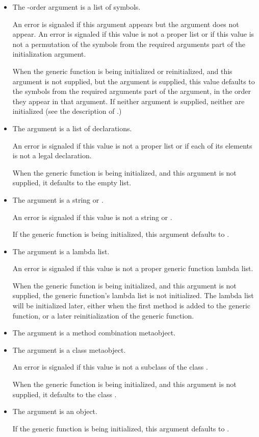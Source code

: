 \begin{itemize}
\item 
  The -order argument is a list of symbols.

  An error is signaled if this argument appears but the 
  argument does not appear. An error is signaled if this value is not a proper
  list or if this value is not a permutation of the symbols from the required
  arguments part of the  initialization argument.

  When the generic function is being initialized or reinitialized, and this
  argument is not supplied, but the  argument is supplied,
  this value defaults to the symbols from the required arguments part of the
   argument, in the order they appear in that argument. If
  neither argument is supplied, neither are initialized (see the description
  of .)

\item The  argument is a list of declarations.

  An error is signaled if this value is not a proper list or if each of its
  elements is not a legal declaration.

  When the generic function is being initialized, and this argument is not
  supplied, it defaults to the empty list.

\item 
  The  argument is a string or .

  An error is signaled if this value is not a string or .

  If the generic function is being initialized, this argument defaults to .

\item 
  The  argument is a lambda list.

  An error is signaled if this value is not a proper generic function lambda list.

  When the generic function is being initialized, and this argument is not
  supplied, the generic function's lambda list is not initialized. The lambda
  list will be initialized later, either when the first method is added to the
  generic function, or a later reinitialization of the generic function.

\item 
  The  argument is a method combination metaobject.

\item 
  The  argument is a class metaobject.

  An error is signaled if this value is not a subclass of the class .

  When the generic function is being initialized, and this argument is not
  supplied, it defaults to the class . 

\item 
  The  argument is an object.

  If the generic function is being initialized, this argument defaults to
  .
\end{itemize}


